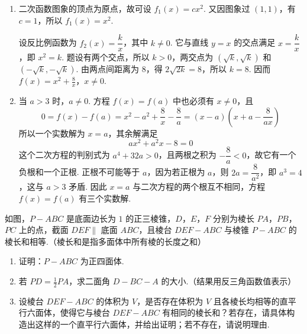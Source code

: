 \begin{solution}
\begin{enumerate}
\item 二次函数图象的顶点为原点，故可设 \(f_{1}(x)=cx^{2}\). 又因图象过 \((1,1)\)，有 \(c=1\)，所以 \(f_{1}(x)=x^{2}\).

设反比例函数为 \(f_{2}(x)=\dfrac{k}{x}\)，其中 \(k\neq0\). 它与直线 \(y=x\) 的交点满足 \(x=\dfrac{k}{x}\)，即 \(x^{2}=k\). 题设有两个交点，所以 \(k>0\)，两交点为 \((\sqrt{k},\sqrt{k})\) 和 \((-\sqrt{k},-\sqrt{k})\). 由两点间距离为 \(8\)，得 \(2\sqrt{2k}=8\)，所以 \(k=8\). 因而
\(f(x)=x^{2}+\frac{8}{x}\)，\(x\neq0\).

\item 当 \(a>3\) 时，\(a\neq0\). 方程 \(f(x)=f(a)\) 中也必须有 \(x\neq0\)，且
\[
0=f(x)-f(a)=x^{2}-a^{2}+\frac{8}{x}-\frac{8}{a}=(x-a)\left(x+a-\frac{8}{ax}\right)
\]
所以一个实数解为 \(x=a\)，其余解满足
\[
ax^{2}+a^{2}x-8=0
\]
这个二次方程的判别式为 \(a^{4}+32a>0\)，且两根之积为 \(-\dfrac{8}{a}<0\)，故它有一个负根和一个正根. 正根不可能等于 \(a\)，因为若正根为 \(a\)，则 \(2a=\dfrac{8}{a^{2}}\)，即 \(a^{3}=4\)，这与 \(a>3\) 矛盾. 因此 \(x=a\) 与二次方程的两个根互不相同，方程 \(f(x)=f(a)\) 有三个实数解.
\end{enumerate}
\end{solution}

\begin{problem}
如图，\(P - ABC\) 是底面边长为 \(1\) 的正三棱锥，\(D\)，\(E\)，\(F\) 分别为棱长 \(PA\)，\(PB\)，\(PC\) 上的点，截面 \(DEF \parallel\) 底面 \(ABC\)，且棱台 \(DEF - ABC\) 与棱锥 \(P - ABC\) 的棱长和相等.（棱长和是指多面体中所有棱的长度之和）

\begin{enumerate}
\item 证明：\(P - ABC\) 为正四面体.
\item 若 \(PD = \frac{1}{2} PA\)，求二面角 \(D - BC - A\) 的大小.（结果用反三角函数值表示）
\item 设棱台 \(DEF - ABC\) 的体积为 \(V\)，是否存在体积为 \(V\) 且各棱长均相等的直平行六面体，使得它与棱台 \(DEF - ABC\) 有相同的棱长和？若存在，请具体构造出这样的一个直平行六面体，并给出证明；若不存在，请说明理由.
\end{enumerate}

\end{problem}


